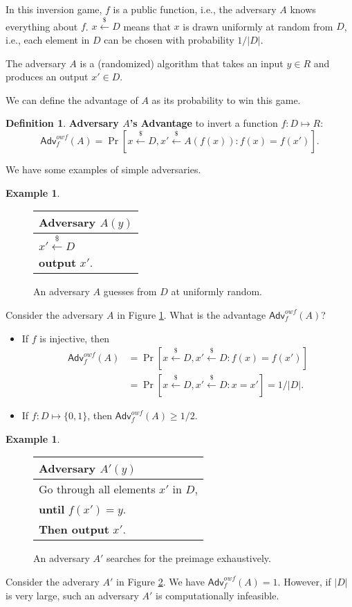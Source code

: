 \documentclass[12pt]{article}
\newcommand{\bits}{\{0,1\}}
\newcommand{\getsr}{\stackrel{\$}{\gets}}
\newcommand{\Adv}{\textsf{Adv}}
\theoremstyle{definition}
\newtheorem{definition}[theorem]{Definition}
\newtheorem{example}[theorem]{Example}
\begin{document}
In this inversion game, $f$ is a public function, i.e., the adversary $A$ knows everything about $f$. $x \getsr D$ means that $x$ is drawn uniformly at random from $D$, i.e., each element in $D$ can be chosen with probability $1/|D|$.

The adversary $A$ is a (randomized) algorithm that takes an input $y\in R$ and produces an output $x'\in D$.

We can define the advantage of $A$ as its probability to win this game.
\begin{definition}
{\bf Adversary $A$'s Advantage} to invert a function $f : D \mapsto R$:
$$\Adv_f^{owf}(A) = \Pr [x\getsr D, x'\getsr A(f(x)) : f(x)=f(x')].$$
\end{definition}

We have some examples of simple adversaries.
\begin{example}
\begin{figure}[!ht]
\centering
\begin{tabular}{l}
Adversary $A(y)$\\
\hline
$x' \getsr D$\\
{\bf output} $x'$.\\
\end{tabular}
\caption{An adversary $A$ guesses from $D$ at uniformly random.}
\label{fig:rg}
\end{figure}

Consider the adversary $A$ in Figure \ref{fig:rg}. What is the advantage $\Adv_f^{owf}(A)$?
\begin{itemize}
\item If $f$ is injective, then
$$
\begin{aligned}
\Adv_f^{owf}(A) &= \Pr [x\getsr D, x'\getsr D : f(x) = f(x')] \\
&= \Pr [x\getsr D, x'\getsr D : x = x'] = 1/|D|.
\end{aligned}$$

\item If $f : D \mapsto \bits$, then $\Adv_f^{owf}(A) \geq 1/2$.
\end{itemize}
\end{example}

\begin{example}
\begin{figure}[!ht]
\centering
\begin{tabular}{l}
Adversary $A'(y)$\\
\hline
Go through all elements $x'$ in $D$, \\
{\bf until} $f(x')=y$. \\
{\bf Then output} $x'$.\\
\end{tabular}
\caption{An adversary $A'$ searches for the preimage exhaustively.}
\label{fig:bf}
\end{figure}

Consider the adverary $A'$ in Figure \ref{fig:bf}. We have $\Adv_f^{owf}(A) = 1$. However, if $|D|$ is very large, such an adversary $A'$ is computationally infeasible.
\end{example}
\end{document}
